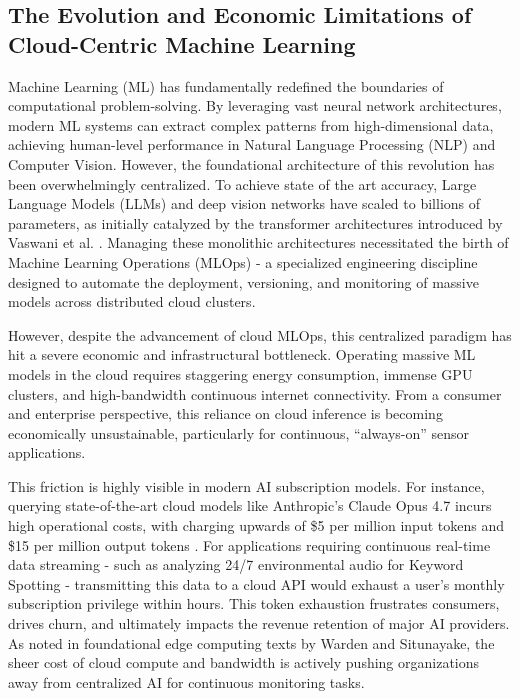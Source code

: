 \documentclass[11pt,a4paper,openany]{book}
\begin{document}
\subsection{The Evolution and Economic Limitations of Cloud-Centric Machine Learning}
Machine Learning (ML) has fundamentally redefined the boundaries of computational problem-solving. By leveraging vast neural network architectures, modern ML systems can extract complex patterns from high-dimensional data, achieving human-level performance in Natural Language Processing (NLP) and Computer Vision. However, the foundational architecture of this revolution has been overwhelmingly centralized. To achieve state of the art accuracy, Large Language Models (LLMs) and deep vision networks have scaled to billions of parameters, as initially catalyzed by the transformer architectures introduced by Vaswani et al. \cite{1}. Managing these monolithic architectures necessitated the birth of Machine Learning Operations (MLOps) - a specialized engineering discipline designed to automate the deployment, versioning, and monitoring of massive models across distributed cloud clusters.

However, despite the advancement of cloud MLOps, this centralized paradigm has hit a severe economic and infrastructural bottleneck. Operating massive ML models in the cloud requires staggering energy consumption, immense GPU clusters, and high-bandwidth continuous internet connectivity. From a consumer and enterprise perspective, this reliance on cloud inference is becoming economically unsustainable, particularly for continuous, ``always-on'' sensor applications.

This friction is highly visible in modern AI subscription models. For instance, querying state-of-the-art cloud models like Anthropic's Claude Opus 4.7 incurs high operational costs, with charging upwards of \$5 per million input tokens and \$15 per million output tokens \cite{2}. For applications requiring continuous real-time data streaming - such as analyzing 24/7 environmental audio for Keyword Spotting - transmitting this data to a cloud API would exhaust a user's monthly subscription privilege within hours. This token exhaustion frustrates consumers, drives churn, and ultimately impacts the revenue retention of major AI providers. As noted in foundational edge computing texts by Warden and Situnayake, the sheer cost of cloud compute and bandwidth is actively pushing organizations away from centralized AI for continuous monitoring tasks.
\end{document}
